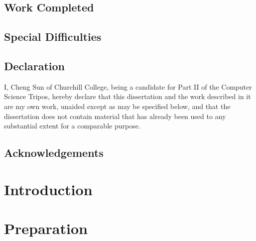 \documentclass[12pt,a4paper,twoside,openright]{report}
\begin{document}
\section*{Work Completed}


\section*{Special Difficulties}

 
\newpage
\section*{Declaration}

I, Cheng Sun of Churchill College, being a candidate for Part II of the Computer
Science Tripos, hereby declare
that this dissertation and the work described in it are my own work,
unaided except as may be specified below, and that the dissertation
does not contain material that has already been used to any substantial
extent for a comparable purpose.

\bigskip
{}

\medskip
{}

\tableofcontents

\listoffigures

\newpage
\section*{Acknowledgements}



\pagestyle{headings}

\chapter{Introduction}



\chapter{Preparation}
\end{document}
